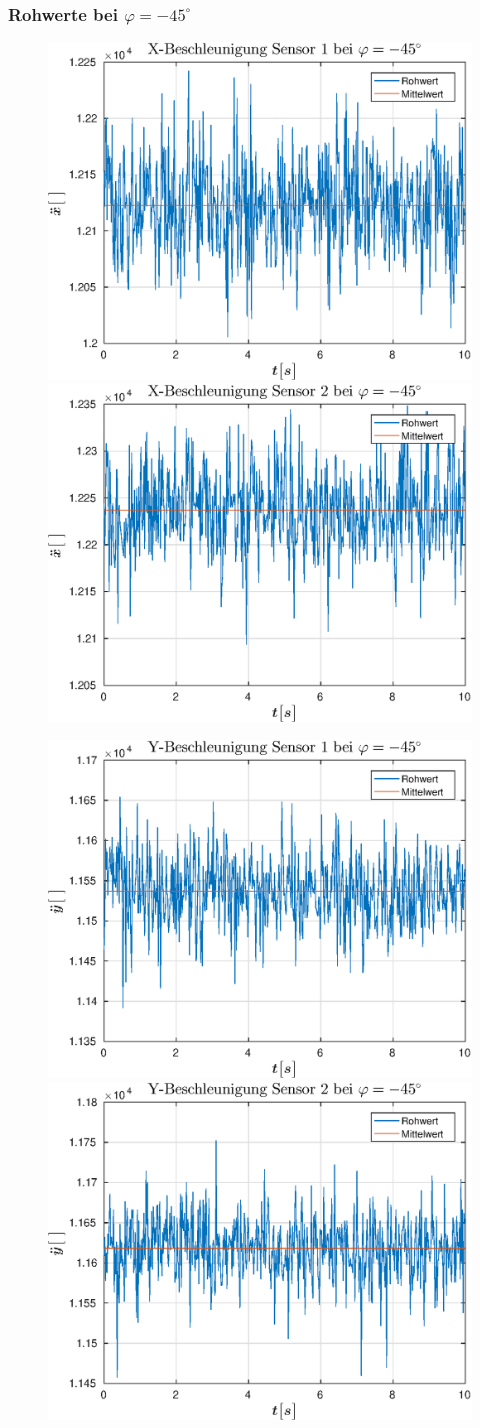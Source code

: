 \subsubsection{Rohwerte bei $\varphi = -45^{\circ}$}
\begin{figure}[h]
	\includegraphics[width=0.5\linewidth]{img/X1__dd___phi_-45.eps}
	\includegraphics[width=0.5\linewidth]{img/X2__dd___phi_-45.eps}
\end{figure}
\begin{figure}[h]
	\includegraphics[width=0.5\linewidth]{img/Y1__dd___phi_-45.eps}
	\includegraphics[width=0.5\linewidth]{img/Y2__dd___phi_-45.eps}
\end{figure}

